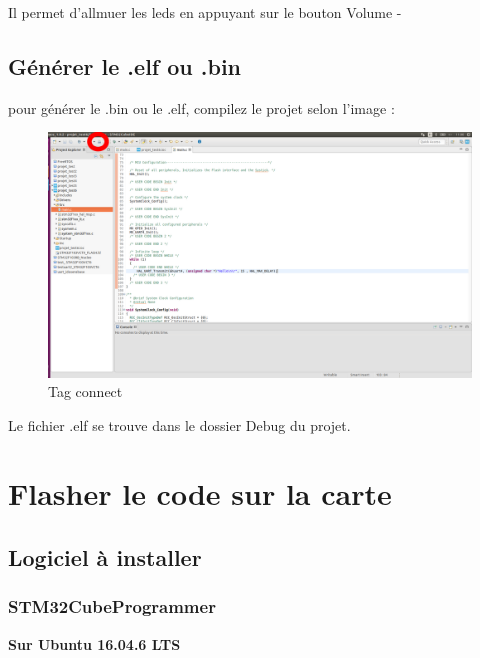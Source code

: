 \documentclass{article}
\begin{document}
Il permet d'allmuer les leds en appuyant sur le bouton Volume -

\subsection{Générer le .elf ou .bin}

pour générer le .bin ou le .elf, compilez le projet selon l'image :

\begin{figure}[H]
\begin{center}
\advance\leftskip-3cm
\advance\rightskip-3cm
\includegraphics[keepaspectratio=true,scale=0.3]{build_all.png}
\caption{Tag connect}
\label{visina8}
\end{center}\end{figure}

Le fichier .elf se trouve dans le dossier Debug du projet.

\section{Flasher le code sur la carte}
\subsection{Logiciel à installer}
\subsubsection{STM32CubeProgrammer}
\textbf{Sur Ubuntu 16.04.6 LTS}
\end{document}
